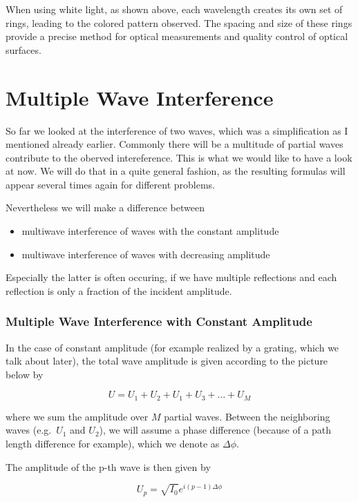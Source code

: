 \documentclass[
  a4paper,
]{book}
\providecommand{\tightlist}{%
  \setlength{\itemsep}{0pt}\setlength{\parskip}{0pt}}
\begin{document}
When using white light, as shown above, each wavelength creates its own
set of rings, leading to the colored pattern observed. The spacing and
size of these rings provide a precise method for optical measurements
and quality control of optical surfaces.

\chapter{Multiple Wave Interference}\label{multiple-wave-interference}

So far we looked at the interference of two waves, which was a
simplification as I mentioned already earlier. Commonly there will be a
multitude of partial waves contribute to the oberved intereference. This
is what we would like to have a look at now. We will do that in a quite
general fashion, as the resulting formulas will appear several times
again for different problems.

Nevertheless we will make a difference between

\begin{itemize}
\tightlist
\item
  multiwave interference of waves with the constant amplitude
\item
  multiwave interference of waves with decreasing amplitude
\end{itemize}

Especially the latter is often occuring, if we have multiple reflections
and each reflection is only a fraction of the incident amplitude.

\subsection{Multiple Wave Interference with Constant
Amplitude}\label{multiple-wave-interference-with-constant-amplitude}

In the case of constant amplitude (for example realized by a grating,
which we talk about later), the total wave amplitude is given according
to the picture below by

\[
U=U_1+U_2+U_1+U_3+\ldots+U_M
\]

where we sum the amplitude over \(M\) partial waves. Between the
neighboring waves (e.g.~\(U_1\) and \(U_2\)), we will assume a phase
difference (because of a path length difference for example), which we
denote as \(\Delta \phi\).

The amplitude of the p-th wave is then given by

\[
U_p=\sqrt{I_0}e^{i(p-1)\Delta \phi}
\]
\end{document}
